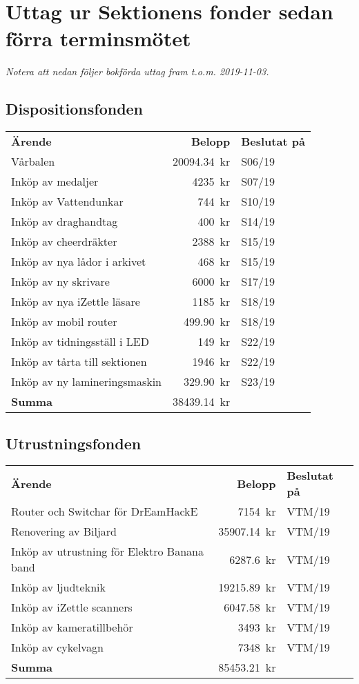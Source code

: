 \documentclass[../_main/handlingar.tex]{subfiles}
\begin{document}
\section{Uttag ur Sektionens fonder sedan förra terminsmötet}
\emph{Notera att nedan följer bokförda uttag fram t.o.m. 2019-11-03.}

\subsection*{Dispositionsfonden}
\begin{tabular}{l r l}
    \textbf{Ärende} & \textbf{Belopp} & \textbf{Beslutat på} \\
    Vårbalen & \SI{20094.34}{kr} & S06/19 \\
    Inköp av medaljer & \SI{4235}{kr} & S07/19 \\
    Inköp av Vattendunkar & \SI{744}{kr} & S10/19 \\
    Inköp av draghandtag & \SI{400}{kr} & S14/19 \\
    Inköp av cheerdräkter & \SI{2388}{kr} & S15/19 \\
    Inköp av nya lådor i arkivet & \SI{468}{kr} & S15/19 \\
    Inköp av ny skrivare & \SI{6000}{kr} & S17/19 \\
    Inköp av nya iZettle läsare & \SI{1185}{kr} & S18/19 \\
    Inköp av mobil router & \SI{499.90}{kr} & S18/19 \\
    Inköp av tidningsställ i LED & \SI{149}{kr} & S22/19 \\
    Inköp av tårta till sektionen & \SI{1946}{kr} & S22/19 \\
    Inköp av ny lamineringsmaskin & \SI{329.90}{kr} & S23/19 \\
    \hline
    \textbf{Summa} & \SI{38439.14}{kr} \\
\end{tabular}

\subsection*{Utrustningsfonden}
\begin{tabular}{l r l}
    \textbf{Ärende} & \textbf{Belopp} & \textbf{Beslutat på} \\
    Router och Switchar för DrEamHackE & \SI{7154}{kr} & VTM/19 \\
    Renovering av Biljard & \SI{35907.14}{kr} & VTM/19 \\
    Inköp av utrustning för Elektro Banana band & \SI{6287.6}{kr} & VTM/19 \\
    Inköp av ljudteknik & \SI{19215.89}{kr} & VTM/19 \\
    Inköp av iZettle scanners & \SI{6047.58}{kr} & VTM/19 \\
    Inköp av kameratillbehör & \SI{3493}{kr} & VTM/19 \\
    Inköp av cykelvagn & \SI{7348}{kr} & VTM/19 \\
    \hline
    \textbf{Summa} & \SI{85453.21}{kr} \\
\end{tabular}
\end{document}
